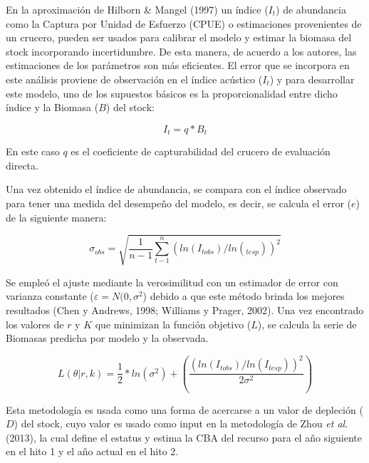 \documentclass[
  spanish,
]{article}
\begin{document}
\quad

En la aproximación de Hilborn \& Mangel (1997) un índice (\(I_t\)) de
abundancia como la Captura por Unidad de Esfuerzo (CPUE) o estimaciones
provenientes de un crucero, pueden ser usados para calibrar el modelo y
estimar la biomasa del stock incorporando incertidumbre. De esta manera,
de acuerdo a los autores, las estimaciones de los parámetros son más
eficientes. El error que se incorpora en este análisis proviene de
observación en el índice acústico (\(I_t\)) y para desarrollar este
modelo, uno de los supuestos básicos es la proporcionalidad entre dicho
índice y la Biomasa (\(B\)) del stock:

\vspace{0.5cm}
\begin{equation}
I_t=q*B_t
\end{equation} 
\vspace{0.5cm}

En este caso \(q\) es el coeficiente de capturabilidad del crucero de
evaluación directa.

Una vez obtenido el índice de abundancia, se compara con el índice
observado para tener una medida del desempeño del modelo, es decir, se
calcula el error (\(e\)) de la siguiente manera:

\vspace{0.5cm}
\begin{equation}
\sigma_{obs}=\sqrt{\frac{1}{n-1}\sum_{t-1}^{n}\left(ln(I_{t obs})/ln( _{t esp})\right)^2}
\end{equation} 
\vspace{0.5cm}

Se empleó el ajuste mediante la verosimilitud con un estimador de error
con varianza constante (\(\varepsilon=N(0,\sigma^2\)) debido a que este
método brinda los mejores resultados (Chen y Andrews, 1998; Williams y
Prager, 2002). Una vez encontrado los valores de \(r\) y \(K\) que
minimizan la función objetivo (\(L\)), se calcula la serie de Biomasas
predicha por modelo y la observada.

\vspace{0.5cm}
\begin{equation}
L(\theta|r,k)=\frac{1}{2}*ln(\sigma^2)+\left(\frac{(ln(I_{t obs})/ln(I_{t esp}))^2}{2 \sigma^2} \right)
\end{equation} 
\vspace{0.5cm}

Esta metodología es usada como una forma de acercarse a un valor de
depleción (\(D\)) del stock, cuyo valor es usado como input en la
metodología de Zhou \emph{et al}. (2013), la cual define el estatus y
estima la CBA del recurso para el año siguiente en el hito 1 y el año
actual en el hito 2.
\end{document}
